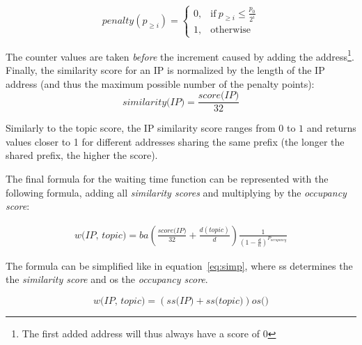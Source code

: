 \begin{equation}
    \textit{penalty}(p_{\geq i})=
    \begin{cases}
      0, & \text{if}\ p_{\geq i} \leq \frac{p_0}{2^i} \\
      1, & \text{otherwise}
    \end{cases}
  \end{equation}

The counter values are taken \emph{before} the increment caused by adding the address\footnote{The first added address will thus always have a score of $0$}. 
Finally, the similarity score for an IP is normalized by the length of the IP address (and thus the maximum possible number of the penalty points):
\begin{equation}
    \textit{similarity(IP}) = \frac{\textit{score(IP)}}{32}
\end{equation}

Similarly to the topic score, the IP similarity score ranges from $0$ to $1$ and returns values closer to 1 for different addresses sharing the same prefix (the longer the shared prefix, the higher the score).

The final formula for the waiting time function can be represented with  the following formula,  adding all \emph{similarity scores} and multiplying by the \emph{occupancy score}:

\begin{equation}
\begin{split}
    \textit{w(IP, topic)} = 
    ba(\frac{\textit{score(IP)}}{32} +
    \frac{d(topic)}{d})
    \frac{1}{(1-\frac{d}{n})^{P_{occupancy}}}
\end{split}
\end{equation}

The formula can be simplified like in equation~\ref{eq:simp}, where ss determines the the \emph{similarity score} and os the \emph{occupancy score}.

\begin{equation}
\label{eq:simp}
    \textit{w(IP, topic)} = 
    (\textit{ss(IP)} + 
    \textit{ss(topic)})
    \textit{os()}
\end{equation}

